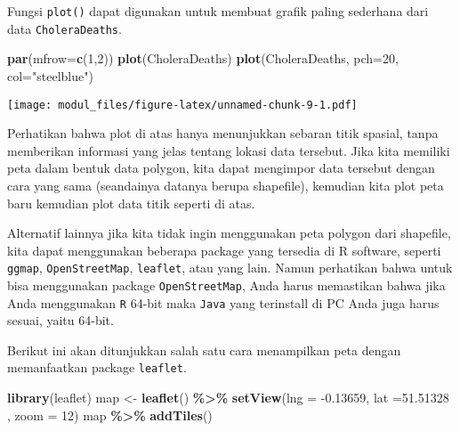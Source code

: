 \documentclass[
]{book}
\newenvironment{Shaded}{\begin{snugshade}}{\end{snugshade}}
\newcommand{\DataTypeTok}[1]{\textcolor[rgb]{0.13,0.29,0.53}{#1}}
\newcommand{\DecValTok}[1]{\textcolor[rgb]{0.00,0.00,0.81}{#1}}
\newcommand{\FloatTok}[1]{\textcolor[rgb]{0.00,0.00,0.81}{#1}}
\newcommand{\KeywordTok}[1]{\textcolor[rgb]{0.13,0.29,0.53}{\textbf{#1}}}
\newcommand{\NormalTok}[1]{#1}
\newcommand{\OperatorTok}[1]{\textcolor[rgb]{0.81,0.36,0.00}{\textbf{#1}}}
\newcommand{\StringTok}[1]{\textcolor[rgb]{0.31,0.60,0.02}{#1}}
\begin{document}
Fungsi \texttt{plot()} dapat digunakan untuk membuat grafik paling sederhana dari data \texttt{CholeraDeaths}.

\begin{Shaded}
\begin{Highlighting}[]
\KeywordTok{par}\NormalTok{(}\DataTypeTok{mfrow=}\KeywordTok{c}\NormalTok{(}\DecValTok{1}\NormalTok{,}\DecValTok{2}\NormalTok{))}
\KeywordTok{plot}\NormalTok{(CholeraDeaths)}
\KeywordTok{plot}\NormalTok{(CholeraDeaths, }\DataTypeTok{pch=}\DecValTok{20}\NormalTok{, }\DataTypeTok{col=}\StringTok{"steelblue"}\NormalTok{)}
\end{Highlighting}
\end{Shaded}

\texttt{[image: modul\_files/figure-latex/unnamed-chunk-9-1.pdf]}

Perhatikan bahwa plot di atas hanya menunjukkan sebaran titik spasial, tanpa memberikan informasi yang jelas tentang lokasi data tersebut. Jika kita memiliki peta dalam bentuk data polygon, kita dapat mengimpor data tersebut dengan cara yang sama (seandainya datanya berupa shapefile), kemudian kita plot peta baru kemudian plot data titik seperti di atas.

Alternatif lainnya jika kita tidak ingin menggunakan peta polygon dari shapefile, kita dapat menggunakan beberapa package yang tersedia di R software, seperti \texttt{ggmap}, \texttt{OpenStreetMap}, \texttt{leaflet}, atau yang lain. Namun perhatikan bahwa untuk bisa menggunakan package \texttt{OpenStreetMap}, Anda harus memastikan bahwa jika Anda menggunakan \texttt{R} 64-bit maka \texttt{Java} yang terinstall di PC Anda juga harus sesuai, yaitu 64-bit.

Berikut ini akan ditunjukkan salah satu cara menampilkan peta dengan memanfaatkan package \texttt{leaflet}.

\begin{Shaded}
\begin{Highlighting}[]
\KeywordTok{library}\NormalTok{(leaflet)}
\NormalTok{map \textless{}{-}}\StringTok{ }\KeywordTok{leaflet}\NormalTok{() }\OperatorTok{\%\textgreater{}\%}\StringTok{ }\KeywordTok{setView}\NormalTok{(}\DataTypeTok{lng =}  \FloatTok{{-}0.13659}\NormalTok{, }\DataTypeTok{lat =}\FloatTok{51.51328}\NormalTok{ , }\DataTypeTok{zoom =} \DecValTok{12}\NormalTok{)}
\NormalTok{map }\OperatorTok{\%\textgreater{}\%}\StringTok{ }\KeywordTok{addTiles}\NormalTok{() }
\end{Highlighting}
\end{Shaded}
\end{document}
